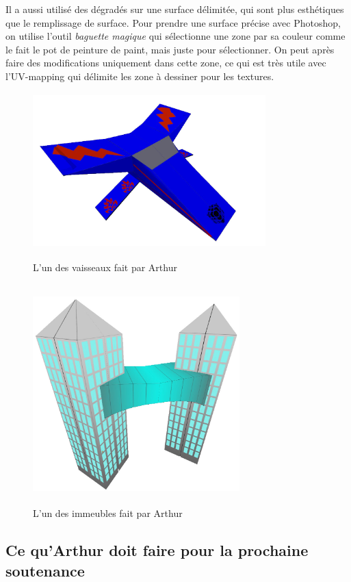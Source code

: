 \documentclass[10pt, titlepage]{report}
\begin{document}
 Il a aussi utilisé des dégradés sur une surface délimitée, qui sont plus esthétiques que le remplissage de surface. Pour prendre une surface précise avec Photoshop, on utilise l'outil \textit{baguette magique} qui sélectionne une zone par sa couleur comme le fait le pot de peinture de paint, mais juste pour sélectionner. On peut après faire des modifications uniquement dans cette zone, ce qui est très utile avec l'UV-mapping qui délimite les zone à dessiner pour les textures.\\

\begin{figure}
\center
\includegraphics[height=6cm, width=9cm]{vaisseau_arthur.jpg}
\caption{L'un des vaisseaux fait par Arthur}

\includegraphics[height=8.5cm, width=8cm]{batiment_arthur.jpg}
\caption{L'un des immeubles fait par Arthur}
\end{figure}

\subsection{Ce qu'Arthur doit faire pour la prochaine soutenance}
\end{document}
